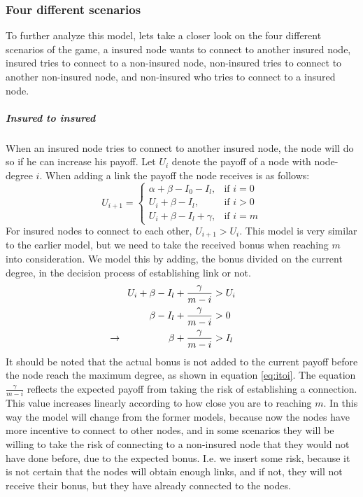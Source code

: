 \subsubsection{Four different scenarios}
To further analyze this model, lets take a closer look on the four different scenarios of the game, a insured node wants to connect to another insured node, insured tries to connect to a non-insured node, non-insured tries to connect to another non-insured node, and non-insured who tries to connect to a insured node.
\subparagraph{Insured to insured}
When an insured node tries to connect to another insured node, the node will do so if he can increase his payoff. 
Let $U_{i}$ denote the payoff of a node with node-degree $i$. When adding a link the payoff the node receives is as follows:
\begin{equation}
    U_{i+1}= 
\begin{cases}
    \alpha + \beta - I_{0} - I_{l},& \text{if } i = 0\\
    U_{i}+\beta -I_{l},& \text{if }  i>0\\
    U_{i}+\beta -I_{l}+\gamma,& \text{if } i=m
    
\end{cases}
\label{eq:itoi}
\end{equation}
For insured nodes to connect to each other, $U_{i+1} > U_{i}$. This model is very similar to the earlier model, but we need to take the received bonus when reaching $m$ into consideration.
We model this by adding, the bonus divided on the current degree, in the decision process of establishing link or not. 
\begin{eqnarray}
U_{i}+\beta-I_{l}+\frac{\gamma}{m-i}&>U_{i} \nonumber \\ 
\beta-I_{l}+\frac{\gamma}{m-i}&>0 \nonumber \\ 
\llap{$\rightarrow$\hspace{50pt}} \beta+\frac{\gamma}{m-i}&>I_{l} 
\label{eq:itoi2}
\end{eqnarray}
It should be noted that the actual bonus is not added to the current payoff before the node reach the maximum degree, as shown in equation \ref{eq:itoi}. The equation $\frac{\gamma}{ m-i}$ reflects the expected payoff from taking the risk of establishing a connection. This value increases linearly according to how close you are to reaching $m$.
In this way the model will change from the former models, because now the nodes have more incentive to connect to other nodes, and in some scenarios they will be willing to take the risk of connecting to a non-insured node that they would not have done before, due to the expected bonus. I.e. we insert some risk, because it is not certain that the nodes will obtain enough links, and if not, they will not receive their bonus, but they have already connected to the nodes.

